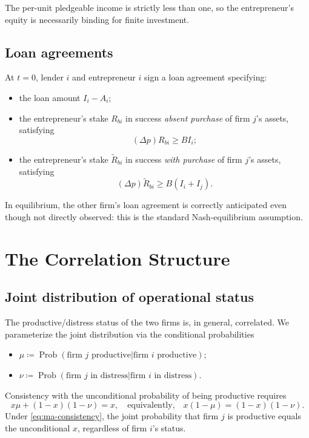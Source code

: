 \documentclass[11pt,a4paper,oneside]{book}
\def\geq{\geqslant}
\DeclareMathOperator{\Prob}{Prob}
\theoremstyle{plain}
\theoremstyle{definition}
\theoremstyle{remark}
\numberwithin{equation}{chapter}
\begin{document}
The per-unit pledgeable income is strictly less than one, so the entrepreneur's equity is necessarily binding for finite investment.

\subsection{Loan agreements}

At $t = 0$, lender $i$ and entrepreneur $i$ sign a loan agreement specifying:
\begin{itemize}
  \item the loan amount $I_i - A_i$;
  \item the entrepreneur's stake $R_{b i}$ in success \emph{absent purchase} of firm $j$'s assets, satisfying
  \begin{equation}\label{eq:ma-IC-no-purchase}
    (\Delta p) R_{b i} \geq B I_i;
  \end{equation}
  \item the entrepreneur's stake $\widetilde{R}_{b i}$ in success \emph{with purchase} of firm $j$'s assets, satisfying
  \begin{equation}\label{eq:ma-IC-purchase}
    (\Delta p) \widetilde{R}_{b i} \geq B (I_i + I_j).
  \end{equation}
\end{itemize}
In equilibrium, the other firm's loan agreement is correctly anticipated even though not directly observed: this is the standard Nash-equilibrium assumption.

\section{The Correlation Structure}
\label{sec:ma-correlation}

\subsection{Joint distribution of operational status}

The productive/distress status of the two firms is, in general, correlated.
We parameterize the joint distribution via the conditional probabilities
\begin{itemize}
  \item $\mu \coloneqq \Prob(\text{firm } j \text{ productive} \vert \text{firm } i \text{ productive})$;
  \item $\nu \coloneqq \Prob(\text{firm } j \text{ in distress} \vert \text{firm } i \text{ in distress})$.
\end{itemize}
Consistency with the unconditional probability of being productive requires
\begin{equation}\label{eq:ma-consistency}
  x \mu + (1 - x)(1 - \nu) = x,
  \quad \text{equivalently,} \quad
  x(1 - \mu) = (1 - x)(1 - \nu).
\end{equation}
Under \eqref{eq:ma-consistency}, the joint probability that firm $j$ is productive equals the unconditional $x$, regardless of firm $i$'s status.
\end{document}
